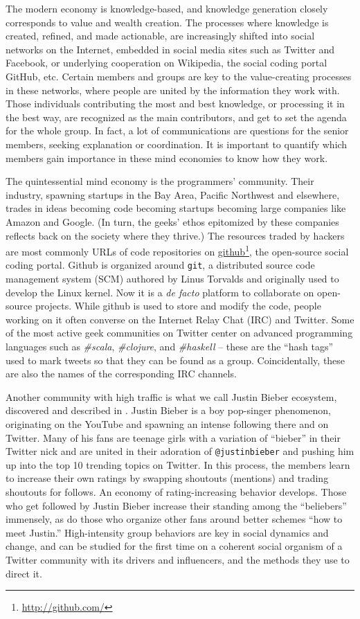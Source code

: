 \documentclass[10pt,oneside]{memoir}
\begin{document}
The modern economy is knowledge-based, and knowledge generation closely corresponds to value and wealth creation. The processes where knowledge is created, refined, and made actionable, are increasingly shifted into social networks on the Internet, embedded in social media sites such as Twitter and Facebook, or underlying cooperation on Wikipedia, the social coding portal GitHub, etc. Certain members and groups are key to the value-creating processes in these networks, where people are united by the information they work with. Those individuals contributing the most and best knowledge, or processing it in the best way, are recognized as the main contributors, and get to set the agenda for the whole group. In fact, a lot of communications are questions for the senior members, seeking explanation or coordination. It is important to quantify which members gain importance in these mind economies to know how they work.


The quintessential mind economy is the programmers' community. Their industry, spawning startups in the Bay Area, Pacific Northwest and elsewhere, trades in ideas becoming code becoming startups becoming large companies like Amazon and Google. (In turn, the geeks' ethos epitomized by these companies reflects back on the society where they thrive.) The resources traded by hackers are most commonly URLs of code repositories on \href{http://github.com/}{github}\footnote{\href{http://github.com/}{http://github.com/}}, the open-source social coding portal. Github is organized around \texttt{git}, a distributed source code management system (SCM) authored by Linus Torvalds and originally used to develop the Linux kernel. Now it is a {\itshape de facto} platform to collaborate on open-source projects. While github is used to store and modify the code, people working on it often converse on the Internet Relay Chat (IRC) and Twitter. Some of the most active geek communities on Twitter center on advanced programming languages such as {\itshape \#scala}, {\itshape \#clojure}, and {\itshape \#haskell} -- these are the ``hash tags'' used to mark tweets so that they can be found as a group. Coincidentally, these are also the names of the corresponding IRC channels.


Another community with high traffic is what we call Justin Bieber ecosystem, discovered and described in \cite{Khrabrov:2010:Dynamic}. Justin Bieber is a boy pop-singer phenomenon, originating on the YouTube and spawning an intense following there and on Twitter. Many of his fans are teenage girls with a variation of ``bieber'' in their Twitter nick and are united in their adoration of \texttt{@justinbieber} and pushing him up into the top 10 trending topics on Twitter. In this process, the members learn to increase their own ratings by swapping shoutouts (mentions) and trading shoutouts for follows. An economy of rating-increasing behavior develops. Those who get followed by Justin Bieber increase their standing among the ``beliebers'' immensely, as do those who organize other fans around better schemes ``how to meet Justin.'' High-intensity group behaviors are key in social dynamics and change, and can be studied for the first time on a coherent social organism of a Twitter community with its drivers and influencers, and the methods they use to direct it.
\end{document}
